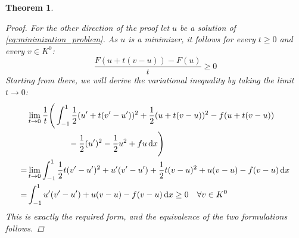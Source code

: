 \documentclass[headsepline,footsepline,footinclude=false,oneside,fontsize=11pt,paper=a4,listof=totoc,bibliography=totoc]{scrbook} %
\newtheorem{theorem}{Theorem}
\begin{document}
\begin{theorem}
\begin{proof}
	For the other direction of the proof let $u$ be a solution of \eqref{eq:minimization_problem}. As $u$ is a minimizer, it follows for every $t \geq 0$ and every $v \in K^0$:
	\begin{equation*}
	\frac{F(u+t(v-u)) - F(u)}{t} \geq 0
	\end{equation*}
	Starting from there, we will derive the variational inequality by taking the limit $t\rightarrow 0$:
	\begingroup
	\allowdisplaybreaks
	\begin{align*}
	&\lim\limits_{t \rightarrow 0} \frac{1}{t} \Bigg( 
	\int_{-1}^{1} \frac{1}{2} (u'+t(v'-u'))^2 + \frac{1}{2} (u+t(v-u))^2 - f(u+t(v-u))\\
	 &\phantom{\lim\limits_{t \rightarrow 0} \frac{1}{t} \Bigg( 
		\int_{-1}^{1}} -\frac{1}{2}(u')^2  - \frac{1}{2}u^2 + fu \dif x \Bigg) \\
	= &\lim\limits_{t \rightarrow 0} \int_{-1}^1 \frac{1}{2} t(v'-u')^2 + u'(v'-u') + \frac{1}{2}t(v-u)^2 + u(v-u) -f(v-u) \dif x \\
	= & 	\int_{-1}^1 u'(v'-u') + u(v-u) - f(v-u) \dif x \geq 0 \quad \forall v \in K^0
	\end{align*}
	\endgroup
	This is exactly the required form, and the equivalence of the two formulations follows.
	\end{proof}
\end{theorem}
\end{document}

